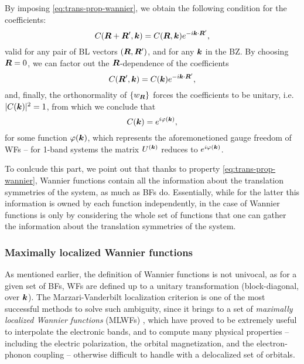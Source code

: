 %
By imposing \cref{eq:trans-prop-wannier}, we obtain the following condition for the coefficients:
%
\begin{equation}
    C({\bm R} + {\bm R}', {\bm k}) = C({\bm R}, {\bm k}) e^{-i{\bm k} \cdot {\bm R}'} ,
    \label{eq:crk-coefficents-trans-prop}
\end{equation}
%
valid for any pair of BL vectors $({\bm R},{\bm R}')$, and for any ${\bm k}$ in the BZ. By choosing ${\bm R}=0$, we can factor out the ${\bm R}$-dependence of the coefficients
%
\begin{equation}
    C({\bm R}',{\bm k}) = C({\bm k}) e^{-i{\bm k} \cdot {\bm R}'} ,
    \label{eq:crk-coefficients-factor-out}
\end{equation}
%
and, finally, the orthonormality of $\{ w_{{\bm R}} \}$ forces the coefficients to be unitary, i.e. $|C({\bm k})|^2=1$, from which we conclude that
\begin{equation}
    C({\bm k}) = e^{i\varphi({\bm k})} ,
\end{equation}
%
for some function $\varphi({\bm k})$, which represents the aforemonetioned gauge freedom of WFs -- for 1-band systems the matrix $U^{({\bm k})}$ reduces to $e^{i\varphi({\bm k})}$.

To conlcude this part, we point out that thanks to property \eqref{eq:trans-prop-wannier}, Wannier functions contain all the information about the translation symmetries of the system, as much as BFs do. Essentially, while for the latter this information is owned by each function independently, in the case of Wannier functions is only by considering the whole set of functions that one can gather the information about the translation symmetries of the system.

\subsubsection*{Maximally localized Wannier functions}
As mentioned earlier, the definition of Wannier functions is not univocal, as for a given set of BFs, WFs are defined up to a unitary transformation (block-diagonal, over ${\bm k}$). The Marzari-Vanderbilt localization criterion is one of the most successful methods to solve such ambiguity, since it brings to a set of \emph{maximally localized Wannier functions} (MLWFs) \cite{marzari_maximally_1997}, which have proved to be extremely useful to interpolate the electronic bands, and to compute many physical properties \cite{marzari_maximally_2012} -- including the electric polarization, the orbital magnetization, and the electron-phonon coupling -- otherwise difficult to handle with a delocalized set of orbitals.

